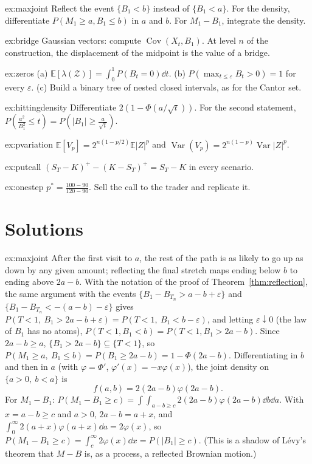 \begin{hint}{ex:maxjoint}
Reflect the event $\{B_1<b\}$ instead of $\{B_1<a\}$. For the density, differentiate $P(M_1\ge a,B_1\le b)$ in $a$ and $b$. For $M_1-B_1$, integrate the density.
\end{hint}
\begin{hint}{ex:bridge}
Gaussian vectors: compute $\operatorname{Cov}(X_t,B_1)$. At level $n$ of the construction, the displacement of the midpoint is the value of a bridge.
\end{hint}
\begin{hint}{ex:zeros}
(a) $\mathbb E[\lambda(\mathcal Z)]=\int_0^1P(B_t=0)\dd t$. (b) $P(\max_{t\le\varepsilon}B_t>0)=1$ for every $\varepsilon$. (c) Build a binary tree of nested closed intervals, as for
the Cantor set.
\end{hint}
\begin{hint}{ex:hittingdensity}
Differentiate $2(1-\Phi(a/\sqrt t))$. For the second statement, $P(\frac{a^2}{B_1^2}\le t)=P(|B_1|\ge\frac a{\sqrt t})$.
\end{hint}
\begin{hint}{ex:pvariation}
$\mathbb E[V_p]=2^{n(1-p/2)}\mathbb E|Z|^p$ and $\operatorname{Var}(V_p)=2^{n(1-p)}\operatorname{Var}|Z|^p$.
\end{hint}
\begin{hint}{ex:putcall}
$(S_T-K)^+-(K-S_T)^+=S_T-K$ in every scenario.
\end{hint}
\begin{hint}{ex:onestep}
$p^*=\frac{100-90}{120-90}$. Sell the call to the trader and replicate it.
\end{hint}

\section{Solutions}

\begin{solution}{ex:maxjoint}
\idea After the first visit to $a$, the rest of the path is as likely to go up as down by any given amount; reflecting the
final stretch maps ending below $b$ to ending above $2a-b$.
\writeup With the notation of the proof of Theorem~\ref{thm:reflection}, the same argument with the events $\{B_1-B_{T_n}>a-b+\varepsilon\}$ and $\{B_1-B_{T_n}<-(a-b)-\varepsilon\}$ gives
$P(T<1,\ B_1>2a-b+\varepsilon)=P(T<1,\ B_1<b-\varepsilon)$, and letting $\varepsilon\downarrow0$ (the law of $B_1$ has no atoms), $P(T<1,B_1<b)=P(T<1,B_1>2a-b)$. Since $2a-b\ge a$,
$\{B_1>2a-b\}\subseteq\{T<1\}$, so $P(M_1\ge a,\ B_1\le b)=P(B_1\ge2a-b)=1-\Phi(2a-b)$. Differentiating in $b$ and then in $a$ (with $\varphi=\Phi'$, $\varphi'(x)=-x\varphi(x)$), the
joint density on $\{a>0,\ b<a\}$ is
\[
f(a,b)=2(2a-b)\varphi(2a-b).
\]
For $M_1-B_1$: $P(M_1-B_1\ge c)=\int\!\!\int_{a-b\ge c}2(2a-b)\varphi(2a-b)\dd b\dd a$. With $x=a-b\ge c$ and $a>0$, $2a-b=a+x$, and $\int_0^\infty2(a+x)\varphi(a+x)\dd a=2\varphi(x)$, so
$P(M_1-B_1\ge c)=\int_c^\infty2\varphi(x)\dd x=P(|B_1|\ge c)$. (This is a shadow of L\'evy's theorem that $M-B$ is, as a process, a reflected Brownian motion.)
\end{solution}

